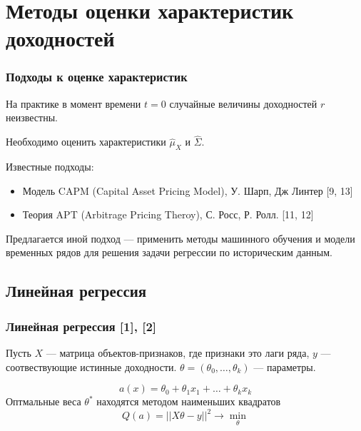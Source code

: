\documentclass{beamer}
\begin{document}



\section{Методы оценки характеристик доходностей}

\begin{frame}
    \frametitle{Подходы к оценке характеристик}

    На практике в момент времени $t=0$ случайные величины доходностей $r$ неизвестны.
    
    Необходимо оценить характеристики $\hat{\mu}_X$ и $\hat{\Sigma}$.

    Известные подходы:
    \begin{itemize}
        \item Модель CAPM (Capital Asset Pricing Model), У. Шарп, Дж Линтер [9, 13]
        \item Теория  APT (Arbitrage Pricing Theroy), С. Росс, Р. Ролл. [11, 12]
    \end{itemize}
    
    Предлагается иной подход --- применить методы машинного обучения и модели временных
    рядов для решения задачи регрессии по историческим данным.
\end{frame}

\subsection{Линейная регрессия}

\begin{frame}
    \frametitle{Линейная регрессия [1], [2]}
    Пусть $X$ --- матрица объектов-признаков, где признаки это лаги ряда,
    $y$ --- соотвествующие истинные доходности.
    $\theta = (\theta_0, \dots, \theta_k)$ --- параметры.
    
    \[
        a(x) = \theta_0 + \theta_1 x_1 + \dots + \theta_k x_k
    \]
    Оптмальные веса $\theta^*$ находятся методом наименьших квадратов
    \[
        Q(a) = || X\theta - y||^2 \rightarrow \min_{\theta}
    \]
\end{frame}
\end{document}
